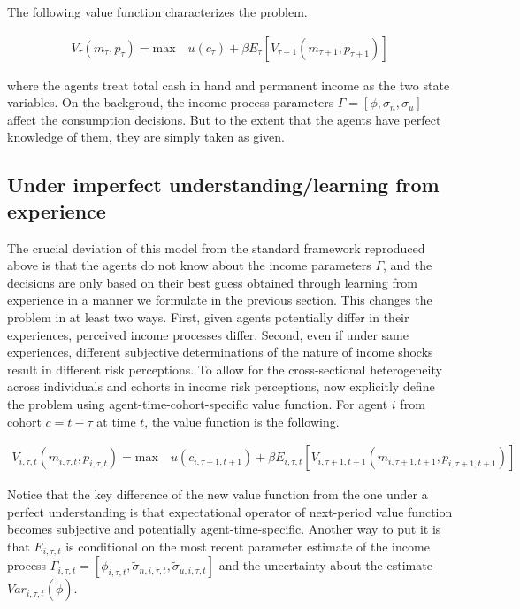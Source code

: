 \documentclass[12pt,notitlepage,onecolumn,aps,pra]{article}
\begin{document}
The following value function characterizes the problem.

\begin{equation}
\begin{split}
V_{\tau}(m_\tau, p_\tau) = \textrm{max} \quad u(c_\tau) + \beta E_{\tau}\left[V_{\tau+1}(m_{\tau+1}, p_{\tau+1})\right] 
\end{split}
\end{equation}

where the agents treat total cash in hand and permanent income as the
two state variables. On the backgroud, the income process parameters
\(\Gamma = [\phi,\sigma_n,\sigma_u]\) affect the consumption decisions.
But to the extent that the agents have perfect knowledge of them, they
are simply taken as given.

\hypertarget{under-imperfect-understandinglearning-from-experience}{%
\subsection{Under imperfect understanding/learning from
experience}\label{under-imperfect-understandinglearning-from-experience}}

The crucial deviation of this model from the standard framework
reproduced above is that the agents do not know about the income
parameters \(\Gamma\), and the decisions are only based on their best
guess obtained through learning from experience in a manner we formulate
in the previous section. This changes the problem in at least two ways.
First, given agents potentially differ in their experiences, perceived
income processes differ. Second, even if under same experiences,
different subjective determinations of the nature of income shocks
result in different risk perceptions. To allow for the cross-sectional
heterogeneity across individuals and cohorts in income risk perceptions,
now explicitly define the problem using agent-time-cohort-specific value
function. For agent \(i\) from cohort \(c=t-\tau\) at time \(t\), the
value function is the following.

\begin{equation}
\begin{split}
V_{i,\tau,t}(m_{i,\tau,t}, p_{i,\tau,t}) = \textrm{max} \quad u(c_{i,\tau+1,t+1}) + \beta E_{i,\tau,t}\left[V_{i,\tau+1,t+1}(m_{i,\tau+1,t+1}, p_{i,\tau+1,t+1})\right] 
\end{split}
\end{equation}

Notice that the key difference of the new value function from the one
under a perfect understanding is that expectational operator of
next-period value function becomes subjective and potentially
agent-time-specific. Another way to put it is that \(E_{i,\tau,t}\) is
conditional on the most recent parameter estimate of the income process
\(\tilde \Gamma_{i,\tau,t} = \left[\tilde \phi_{i,\tau,t},\tilde \sigma_{n,i,\tau,t}, \tilde \sigma_{u,i,\tau,t}\right]\)
and the uncertainty about the estimate \(Var_{i,\tau,t}(\tilde \phi)\).
\end{document}
